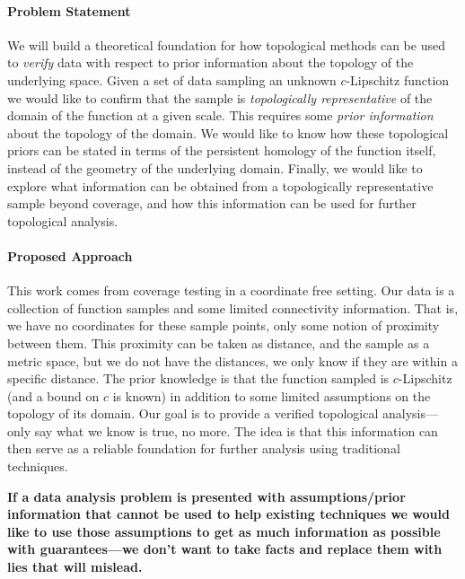 \paragraph{Problem Statement}

We will build a theoretical foundation for how topological methods can be used to \emph{verify} data with respect to prior information about the topology of the underlying space.
Given a set of data sampling an unknown $c$-Lipschitz function we would like to confirm that the sample is \emph{topologically representative} of the domain of the function at a given scale.
This requires some \emph{prior information} about the topology of the domain.
We would like to know how these topological priors can be stated in terms of the persistent homology of the function itself, instead of the geometry of the underlying domain.
Finally, we would like to explore what information can be obtained from a topologically representative sample beyond coverage, and how this information can be used for further topological analysis.

\paragraph{Proposed Approach}

This work comes from coverage testing in a coordinate free setting.
Our data is a collection of function samples and some limited connectivity information.
That is, we have no coordinates for these sample points, only some notion of proximity between them.
This proximity can be taken as distance, and the sample as a metric space, but we do not have the distances, we only know if they are within a specific distance.
The prior knowledge is that the function sampled is $c$-Lipschitz (and a bound on $c$ is known) in addition to some limited assumptions on the topology of its domain.
Our goal is to provide a verified topological analysis---only say what we know is true, no more.
The idea is that this information can then serve as a reliable foundation for further analysis using traditional techniques.

\clearpage

\textbf{If a data analysis problem is presented with assumptions/prior information that cannot be used to help existing techniques we would like to use those assumptions to get as much information as possible with guarantees---we don't want to take facts and replace them with lies that will mislead.}

